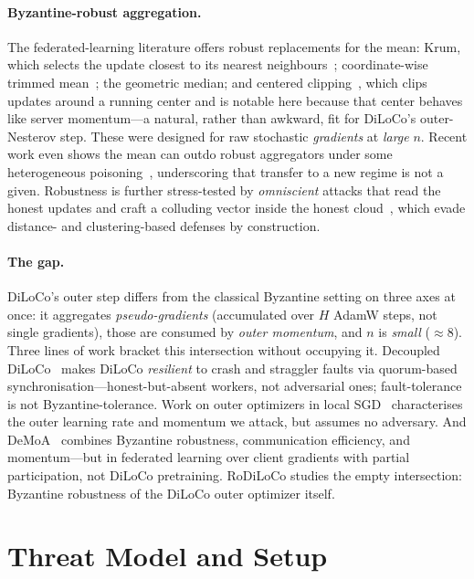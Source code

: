 \documentclass[11pt]{article}
\begin{document}
\paragraph{Byzantine-robust aggregation.}
The federated-learning literature offers robust replacements for the mean: Krum, which selects
the update closest to its nearest neighbours~\citep{krum2017}; coordinate-wise trimmed
mean~\citep{trimmedmean2018}; the geometric median; and centered
clipping~\citep{centeredclipping2021}, which clips updates around a running center and is
notable here because that center behaves like server momentum---a natural, rather than
awkward, fit for DiLoCo's outer-Nesterov step. These were designed for raw stochastic
\emph{gradients} at \emph{large} $n$. Recent work even shows the mean can outdo robust
aggregators under some heterogeneous poisoning~\citep{meanrobust2024}, underscoring that
transfer to a new regime is not a given. Robustness is further stress-tested by
\emph{omniscient} attacks that read the honest updates and craft a colluding vector inside
the honest cloud~\citep{alie2019,minmax2021}, which evade distance- and clustering-based
defenses by construction.

\paragraph{The gap.}
DiLoCo's outer step differs from the classical Byzantine setting on three axes at once: it
aggregates \emph{pseudo-gradients} (accumulated over $H$ AdamW steps, not single gradients),
those are consumed by \emph{outer momentum}, and $n$ is \emph{small} ($\approx 8$). Three lines
of work bracket this intersection without occupying it. Decoupled
DiLoCo~\citep{decoupleddiloco2026} makes DiLoCo \emph{resilient} to crash and straggler faults
via quorum-based synchronisation---honest-but-absent workers, not adversarial ones;
fault-tolerance is not Byzantine-tolerance. Work on outer optimizers in local
SGD~\citep{outeroptimizers2025} characterises the outer learning rate and momentum we attack,
but assumes no adversary. And DeMoA~\citep{demoa2025} combines Byzantine robustness,
communication efficiency, and momentum---but in federated learning over client gradients with
partial participation, not DiLoCo pretraining. RoDiLoCo studies the empty intersection:
Byzantine robustness of the DiLoCo outer optimizer itself.

\section{Threat Model and Setup}
\label{sec:setup}
\end{document}
